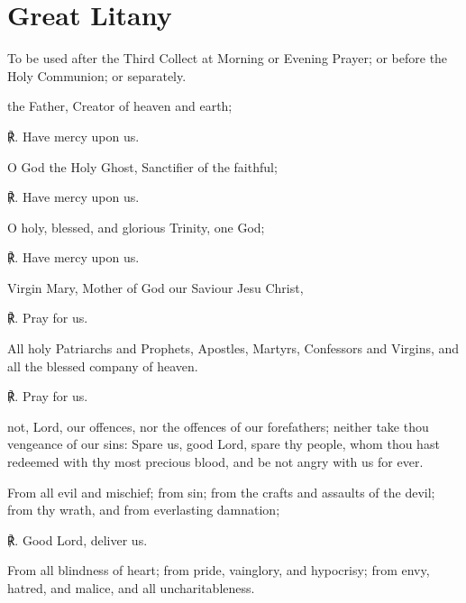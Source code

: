 \label{litany}
\fancyhead[RE,LO]{}
\section{Great Litany}
\begin{rubric}
	{To be used after the Third Collect at Morning or Evening Prayer; or before the Holy Communion; or separately.}
\end{rubric}
 the Father, Creator of heaven and earth;\par
   ℟. Have mercy upon us.
\par\noindent
   O God the Holy Ghost, Sanctifier of the faithful;

   ℟. Have mercy upon us.
   \par\noindent
   O holy, blessed, and glorious Trinity, one God;
   
   ℟. Have mercy upon us.
   \par\noindent
   Virgin Mary, Mother of God our Saviour Jesu Christ,\par
℟. Pray for us.\par\noindent
  All holy Patriarchs and Prophets, Apostles, Martyrs, Confessors and Virgins, and all the blessed company of heaven.\par
℟. Pray for us.
  \par\noindent
    not, Lord, our offences, nor the offences of our forefathers; neither take thou vengeance of our sins: Spare us, good Lord, spare thy people, whom thou hast redeemed with thy most precious blood, and be not angry with us for ever.\par  
   \par\noindent
    From all evil and mischief; from sin; from the crafts and assaults of the devil; from thy wrath, and from everlasting damnation;
    
    ℟. Good Lord, deliver us.
    \par\noindent
    From all blindness of heart; from pride, vainglory, and hypocrisy; from envy, hatred, and malice, and all uncharitableness.
    
